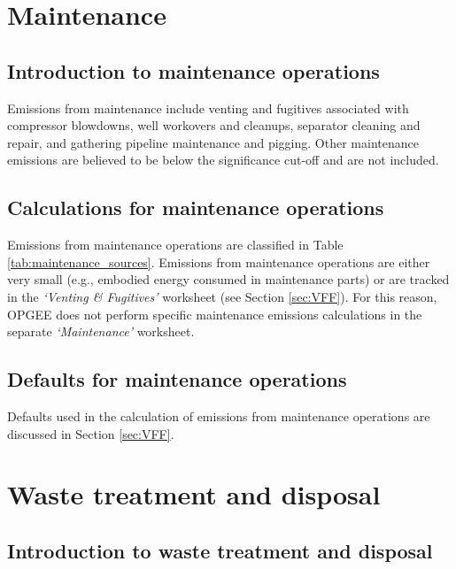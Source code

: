 \documentclass[11pt]{report}
\newcommand{\sheet}[1]{\textit{`{#1}'}}
\begin{document}
\clearpage




\clearpage

\section{Maintenance}
\label{sec:maintenance}

\subsection{Introduction to maintenance operations}

Emissions from maintenance include venting and fugitives associated with compressor blowdowns, well workovers and cleanups, separator cleaning and repair, and gathering pipeline maintenance and pigging. Other maintenance emissions are believed to be below the significance cut-off and are not included.

\subsection{Calculations for maintenance operations}

Emissions from maintenance operations are classified in Table \ref{tab:maintenance_sources}. Emissions from maintenance operations are either very small (e.g., embodied energy consumed in maintenance parts) or are tracked in the \sheet{Venting \& Fugitives} worksheet (see Section \ref{sec:VFF}). For this reason, OPGEE does not perform specific maintenance emissions calculations in the separate \sheet{Maintenance} worksheet.

\subsection{Defaults for maintenance operations}

Defaults used in the calculation of emissions from maintenance operations are discussed in Section \ref{sec:VFF}.


\clearpage

\section{Waste treatment and disposal}
\label{sec:waste}

\subsection{Introduction to waste treatment and disposal}
\end{document}
